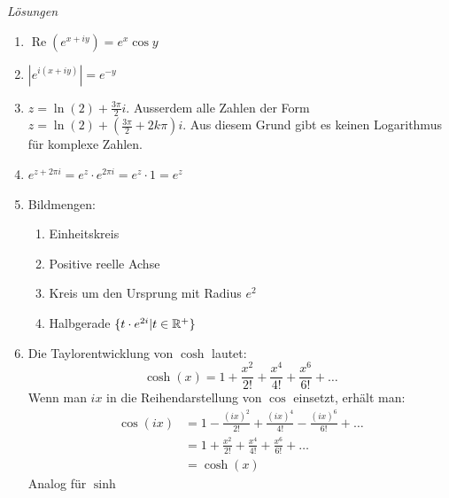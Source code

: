 \clearpage
\emph{Lösungen}
\begin{enumerate}
	\item $\operatorname{Re}(e^{x+iy}) = e^x \cos y$
	\item $|e^{i(x+iy)}| = e^{-y}$
	\item $z = \ln(2) + \frac{3\pi}{2} i$. Ausserdem alle Zahlen der Form $z = \ln(2) + \left(\frac{3\pi}{2}+2k\pi\right) i$. Aus diesem Grund gibt es keinen Logarithmus für komplexe Zahlen.
	\item $e^{z+2\pi i} = e^z\cdot e^{2\pi i} = e^z\cdot 1 = e^z$
	\item Bildmengen:
	      \begin{enumerate}
		      \item Einheitskreis
		      \item Positive reelle Achse
		      \item Kreis um den Ursprung mit Radius $e^2$
		      \item Halbgerade $\{t\cdot e ^{2i} | t \in \mathbb{R}^+\}$
	      \end{enumerate}
	\item Die Taylorentwicklung von $\cosh$ lautet:
	      $$\cosh(x) = 1+\frac{x^2}{2!}+\frac{x^4}{4!}+\frac{x^6}{6!} +\dots  $$
	      Wenn man $ix$ in die Reihendarstellung von $\cos$ einsetzt, erhält man:
	      \begin{align*}
		      \cos(ix) & = 1-\frac{(ix)^2}{2!}+\frac{(ix)^4}{4!}-\frac{(ix)^6}{6!} +\dots \\
		               & = 1+\frac{x^2}{2!}+\frac{x^4}{4!}+\frac{x^6}{6!} +\dots          \\
		               & = \cosh(x)
	      \end{align*}
	      Analog für $\sinh$



\end{enumerate}
